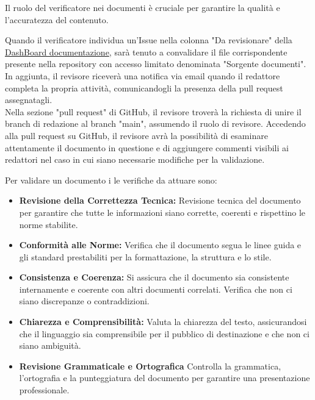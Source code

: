 \documentclass{article}
\begin{document}
    Il ruolo del verificatore nei documenti è cruciale per garantire la qualità e l'accuratezza del contenuto.

Quando il verificatore individua un'Issue nella colonna "Da revisionare" della  \href{https://github.com/orgs/ByteOps-swe/projects/1/views/1}{DashBoard documentazione}, sarà tenuto a convalidare il file corrispondente presente nella repository con accesso limitato denominata "Sorgente documenti". \\
In aggiunta, il revisore riceverà una notifica via email quando il redattore completa la propria attività, comunicandogli la presenza della pull request assegnatagli.\\
Nella sezione "pull request" di GitHub, il revisore troverà la richiesta di unire il branch di redazione al branch "main", assumendo il ruolo di revisore. Accedendo alla pull request su GitHub, il revisore avrà la possibilità di esaminare attentamente il documento in questione e di aggiungere commenti visibili ai redattori nel caso in cui siano necessarie modifiche per la validazione.

\vspace{0.3cm}

Per validare un documento i le verifiche da attuare sono:
\begin{itemize}
    \item \textbf{Revisione della Correttezza Tecnica:} Revisione tecnica del documento per garantire che tutte le informazioni siano corrette, coerenti e rispettino le norme stabilite.
     \item \textbf{Conformità alle Norme:} Verifica che il documento segua le linee guida e gli standard prestabiliti per la formattazione, la struttura e lo stile.
      \item \textbf{Consistenza e Coerenza:} Si assicura che il documento sia consistente internamente e coerente con altri documenti correlati. Verifica che non ci siano discrepanze o contraddizioni.
      \item \textbf{Chiarezza e Comprensibilità:} Valuta la chiarezza del testo, assicurandosi che il linguaggio sia comprensibile per il pubblico di destinazione e che non ci siano ambiguità.
      \item \textbf{Revisione Grammaticale e Ortografica} Controlla la grammatica, l'ortografia e la punteggiatura del documento per garantire una presentazione professionale.
\end{itemize}
\end{document}

